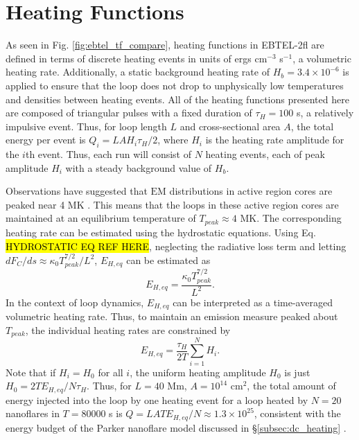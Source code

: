 \section{Heating Functions}
\label{sec:heating_funcs}
%
\par As seen in Fig. \ref{fig:ebtel_tf_compare}, heating functions in EBTEL-2fl are defined in terms of discrete heating events in units of ergs cm$^{-3}$ s$^{-1}$, a volumetric heating rate. Additionally, a static background heating rate of $H_b=3.4\times10^{-6}$ is applied to ensure that the loop does not drop to unphysically low temperatures and densities between heating events. All of the heating functions presented here are composed of triangular pulses with a fixed duration of $\tau_H=100$ s, a relatively impulsive event. Thus, for loop length $L$ and cross-sectional area $A$, the total energy per event is $Q_i=LAH_i\tau_H/2$, where $H_i$ is the heating rate amplitude for the $i$th event. Thus, each run will consist of $N$ heating events, each of peak amplitude $H_i$ with a steady background value of $H_b$.
%
\par Observations have suggested that $\mathrm{EM}$ distributions in active region cores are peaked near 4 MK \citep{warren_constraints_2011,warren_systematic_2012}. This means that the loops in these active region cores are maintained at an equilibrium temperature of $T_{peak}\approx4$ MK. The corresponding heating rate can be estimated using the hydrostatic equations. Using Eq. \hl{HYDROSTATIC EQ REF HERE}, neglecting the radiative loss term and letting $dF_C/ds\approx\kappa_0T_{peak}^{7/2}/L^2$, $E_{H,eq}$ can be estimated as 
\begin{equation}
	\label{eq:heating_rate_est}
	E_{H,eq}=\frac{\kappa_0T_{peak}^{7/2}}{L^2}.
\end{equation}
In the context of loop dynamics, $E_{H,eq}$ can be interpreted as a time-averaged volumetric heating rate. Thus, to maintain an emission measure peaked about $T_{peak}$, the individual heating rates are constrained by 
\begin{equation}
	\label{eq:heating_rate_constraint}
	E_{H,eq} = \frac{\tau_H}{2T}\sum_{i=1}^NH_i.
\end{equation}
Note that if $H_i=H_0$ for all $i$, the uniform heating amplitude $H_0$ is just $H_0=2TE_{H,eq}/N\tau_H$. Thus, for $L=40$ Mm, $A=10^{14}$ cm$^2$, the total amount of energy injected into the loop by one heating event for a loop heated by $N=20$ nanoflares in $T=80000$ s is $Q=LATE_{H,eq}/N\approx1.3\times10^{25}$, consistent with the energy budget of the Parker nanoflare model discussed in \S\ref{subsec:dc_heating} \citep{cargill_active_2014}. 

